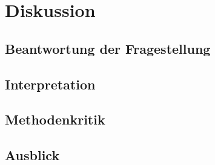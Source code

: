 \section{Diskussion}
\subsection{Beantwortung der Fragestellung}
\subsection{Interpretation}
\subsection{Methodenkritik}
\subsection{Ausblick}